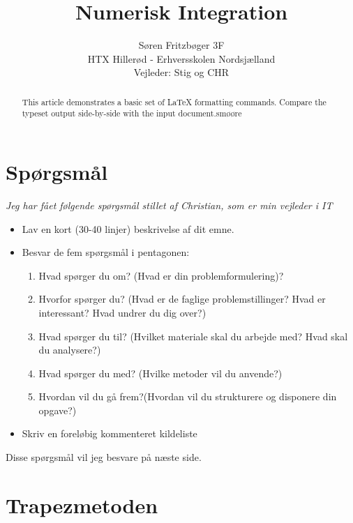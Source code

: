 \documentclass[12pt]{article}
\numberwithin{equation}{section}
\begin{document}
\title{Numerisk Integration}
\author{Søren Fritzbøger 3F\\
HTX Hillerød - Erhversskolen Nordsjælland\\
Vejleder: Stig og CHR}
\renewcommand{\today}{2. Februar 2015}
\maketitle

\begin{abstract}
This article demonstrates a basic set of LaTeX formatting commands.
Compare the typeset output side-by-side with the input document.smøøre
\end{abstract}
\tableofcontents
\section{Spørgsmål}
\emph{Jeg har fået følgende spørgsmål stillet af Christian, som er min vejleder i IT}

\begin{itemize}
\item Lav en kort (30-40 linjer) beskrivelse af dit emne.
\item Besvar de fem spørgsmål i pentagonen:
\begin{enumerate}
\item Hvad spørger du om? (Hvad er din problemformulering)?
\item Hvorfor spørger du? (Hvad er de faglige problemstillinger? Hvad er interessant? Hvad undrer du dig over?)
\item Hvad spørger du til? (Hvilket materiale skal du arbejde med? Hvad skal du
analysere?)
\item Hvad spørger du med? (Hvilke metoder vil du anvende?)
\item Hvordan vil du gå frem?(Hvordan vil du strukturere og disponere din opgave?)
\end{enumerate}
\item Skriv en foreløbig kommenteret kildeliste
\end{itemize}

Disse spørgsmål vil jeg besvare på næste side.

\newpage
\section{Trapezmetoden}
\end{document}
